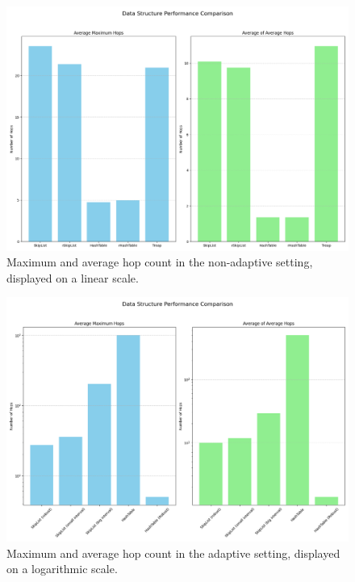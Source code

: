 \begin{figure}[h]
    \centering
    \includegraphics[width=\textwidth]{chapters/ch5_skipping/ch5_images/datastructure_performance.png}
    \caption[Non-adaptive PSDS Results.]{Maximum and average hop count in the non-adaptive setting, displayed on a linear scale.}
    \label{fig:runtimes_nonadaptive}
\end{figure}

\begin{figure}[h]
    \centering
    \includegraphics[width=\textwidth]{chapters/ch5_skipping/ch5_images/adaptive_datastructure_performance.png}
    \caption[Adaptive PSDS Results.]{Maximum and average hop count in the adaptive setting, displayed on a logarithmic scale.}
    \label{fig:runtimes_adaptive}
\end{figure}



